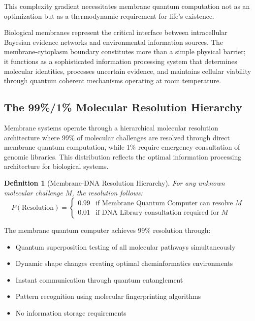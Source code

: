 \documentclass[12pt,a4paper]{article}
\newtheorem{definition}{Definition}
\begin{document}
This complexity gradient necessitates membrane quantum computation not as an optimization but as a thermodynamic requirement for life's existence.

Biological membranes represent the critical interface between intracellular Bayesian evidence networks and environmental information sources. The membrane-cytoplasm boundary constitutes more than a simple physical barrier; it functions as a sophisticated information processing system that determines molecular identities, processes uncertain evidence, and maintains cellular viability through quantum coherent mechanisms operating at room temperature.

\subsection{The 99\%/1\% Molecular Resolution Hierarchy}

Membrane systems operate through a hierarchical molecular resolution architecture where 99\% of molecular challenges are resolved through direct membrane quantum computation, while 1\% require emergency consultation of genomic libraries. This distribution reflects the optimal information processing architecture for biological systems.

\begin{definition}[Membrane-DNA Resolution Hierarchy]
For any unknown molecular challenge $M$, the resolution follows:
\begin{equation}
P(\text{Resolution}) = \begin{cases}
0.99 & \text{if Membrane Quantum Computer can resolve } M \\
0.01 & \text{if DNA Library consultation required for } M
\end{cases}
\end{equation}
\end{definition}

The membrane quantum computer achieves 99\% resolution through:
\begin{itemize}
\item Quantum superposition testing of all molecular pathways simultaneously
\item Dynamic shape changes creating optimal cheminformatics environments  
\item Instant communication through quantum entanglement
\item Pattern recognition using molecular fingerprinting algorithms
\item No information storage requirements
\end{itemize}
\end{document}
